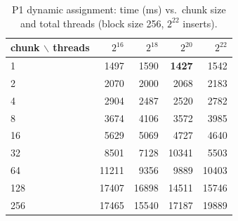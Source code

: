 \begin{table}[H]\centering\small
\caption{P1 dynamic assignment: time (ms) vs.\ chunk size and total threads (block size 256, $2^{22}$ inserts).}\label{tab:p1chunk}
\begin{tabular}{lrrrr}
\toprule
chunk $\backslash$ threads & $2^{16}$ & $2^{18}$ & $2^{20}$ & $2^{22}$ \\
\midrule
1 & 1497 & 1590 & \textbf{1427} & 1542 \\
2 & 2070 & 2000 & 2068 & 2183 \\
4 & 2904 & 2487 & 2520 & 2782 \\
8 & 3674 & 4106 & 3572 & 3985 \\
16 & 5629 & 5069 & 4727 & 4640 \\
32 & 8501 & 7128 & 10341 & 5503 \\
64 & 11211 & 9356 & 9889 & 10403 \\
128 & 17407 & 16898 & 14511 & 15746 \\
256 & 17465 & 15540 & 17187 & 19889 \\
\bottomrule
\end{tabular}
\end{table}
